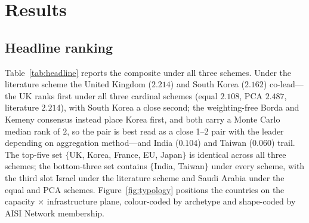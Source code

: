 \documentclass[11pt]{article}
\begin{document}
\section{Results}\label{sec:results}
\subsection{Headline ranking}
Table~\ref{tab:headline} reports the composite under all three schemes. Under the literature scheme the United Kingdom ($2.214$) and South Korea ($2.162$) co-lead---the UK ranks first under all three cardinal schemes (equal $2.108$, PCA $2.487$, literature $2.214$), with South Korea a close second; the weighting-free Borda and Kemeny consensus instead place Korea first, and both carry a Monte Carlo median rank of $2$, so the pair is best read as a close 1--2 pair with the leader depending on aggregation method---and India ($0.104$) and Taiwan ($0.060$) trail. The top-five set $\{$UK, Korea, France, EU, Japan$\}$ is identical across all three schemes; the bottom-three set contains $\{$India, Taiwan$\}$ under every scheme, with the third slot Israel under the literature scheme and Saudi Arabia under the equal and PCA schemes. Figure~\ref{fig:typology} positions the countries on the capacity $\times$ infrastructure plane, colour-coded by archetype and shape-coded by AISI Network membership.
\end{document}
